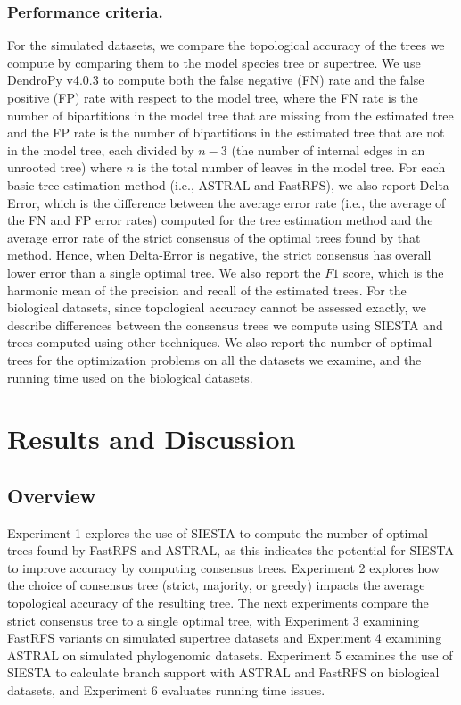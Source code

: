 \subsubsection{Performance criteria. }
For the simulated datasets, we compare the topological accuracy of the trees we compute by comparing them to the model species tree or supertree. 
We  use DendroPy v4.0.3 \cite{dendropy} to compute 
 both the false negative (FN) rate  and the false positive (FP) rate  with respect to the model tree, where the FN rate is the number of bipartitions in the model tree that are missing from the estimated tree and the FP rate is the number of bipartitions in the estimated tree that are not in the model tree, each divided by $n-3$ (the number of internal edges in an unrooted tree) where $n$ is the total number of leaves in the model tree.
For each basic tree estimation method (i.e., ASTRAL and FastRFS), we also report Delta-Error, which is the difference between the average error rate (i.e., the average of the FN and FP error rates) computed for the tree estimation method  and the average error rate of the strict consensus of the optimal trees found by that method. 
Hence, when Delta-Error is negative, the strict consensus has overall lower error than a single optimal tree. 
We also report the $F1$ score, which is the harmonic mean of the
precision and recall of the estimated trees.
For the biological datasets, since topological accuracy cannot be assessed exactly,  
we describe differences between the consensus trees we compute using SIESTA and trees computed using other techniques.
We also report the number of optimal trees for the optimization problems on all the datasets we examine, and the running time used on the biological datasets.






\section{Results and Discussion}
\label{siesta::sec:results}
\subsection{Overview}
Experiment 1 explores the use of SIESTA to compute the number of optimal trees found by FastRFS and ASTRAL, as this indicates the potential for SIESTA to improve accuracy by computing consensus trees.
Experiment 2 explores how the choice of consensus tree (strict, majority, or greedy) impacts the average topological accuracy of the resulting tree.
The next experiments compare the strict consensus tree  to a single optimal tree, with Experiment 3 examining FastRFS variants on simulated supertree datasets and Experiment 4 examining ASTRAL on simulated phylogenomic datasets. 
 Experiment 5 examines the use of SIESTA to calculate branch support  with ASTRAL and FastRFS on  biological  datasets, and Experiment 6 evaluates running time issues.

